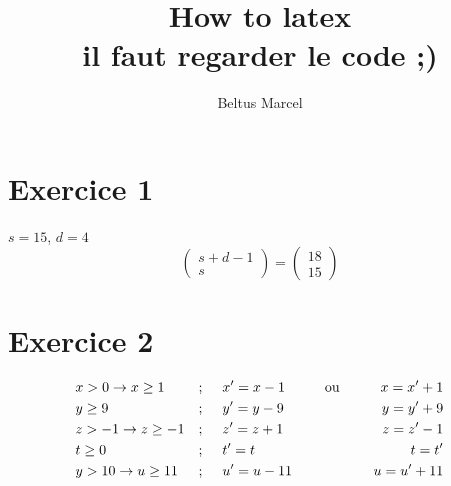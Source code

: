 \documentclass[fontsize=10pt]{article}
\title{\textbf{How to latex}\\ il faut regarder le code ;)}
\author{Beltus Marcel}
\date{}
\begin{document}
\maketitle %


\section*{Exercice 1}
$s = 15$, \hspace{1cm}$d = 4$\\
$$\begin{pmatrix}
s + d -1\\
s
\end{pmatrix}
=
\begin{pmatrix}
18\\
 15
\end{pmatrix}$$
\section*{Exercice 2}
\begin{align*}
&x > 0 \rightarrow x \geq 1 \hspace{0.5cm} &;\hspace{0.5cm}&x' = x-1 \hspace{1cm}\text{ou} \hspace{0.5cm}&x = x'+1 \\
&y \geq 9 &; \hspace{0.5cm}&y' = y-9 & y = y'+9\\
&z>-1 \rightarrow z\geq -1&; \hspace{0.5cm}&z' = z+1 & z = z'-1\\
&t \geq 0 &; \hspace{0.5cm}&t' = t & t = t'\\
&y > 10 \rightarrow u \geq 11 &; \hspace{0.5cm}&u' = u-11 & u = u' +11
\end{align*}
\end{document}
